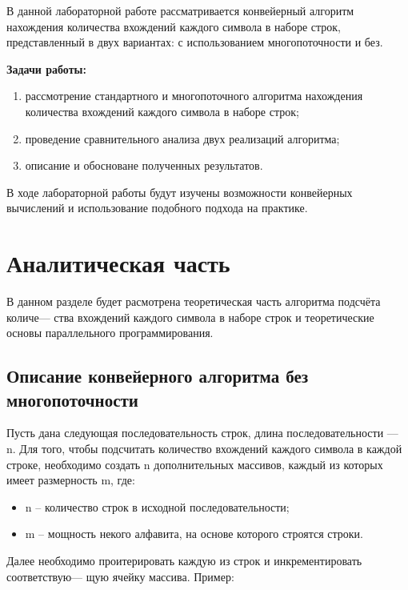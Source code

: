 \documentclass[12pt]{report}
\begin{document}
В данной лабораторной работе рассматривается конвейерный алгоритм нахождения количества вхождений каждого символа в наборе строк, представленный в двух вариантах: с использованием многопоточности и без.

\vspace{\baselineskip}

\textbf{Задачи работы:}
\begin{enumerate}
	\item рассмотрение стандартного и многопоточного алгоритма нахождения количества вхождений каждого символа в наборе строк;
	\item проведение сравнительного анализа двух реализаций алгоритма;
	\item описание и обосноване полученных результатов.
\end{enumerate}

В ходе лабораторной работы будут изучены возможности конвейерных вычислений и использование подобного подхода на практике.

\chapter{Аналитическая часть}

В  данном  разделе  будет  расмотрена  теоретическая  часть  алгоритма  подсчёта  количе— ства  
вхождений  каждого  символа  в наборе  строк  и теоретические  основы  параллельного 
программирования.

\section{Описание конвейерного алгоритма  без  многопоточности}

Пусть  дана  следующая  последовательность строк,  длина  последовательности —  n.
Для  того,  чтобы  подсчитать  количество  вхождений  каждого  символа  в  каждой  строке, 
необходимо  создать  n  дополнительных массивов,  каждый  из которых  имеет  размерность m,  где:
\begin{itemize}
	\item  n  –  количество  строк  в  исходной  последовательности;
	\item m – мощность  некого  алфавита,  на  основе  которого  строятся  строки.
\end{itemize}

Далее  необходимо  проитерировать  каждую  из  строк  и  инкрементировать  соответствую—
щую  ячейку  массива.
Пример:
\end{document}
